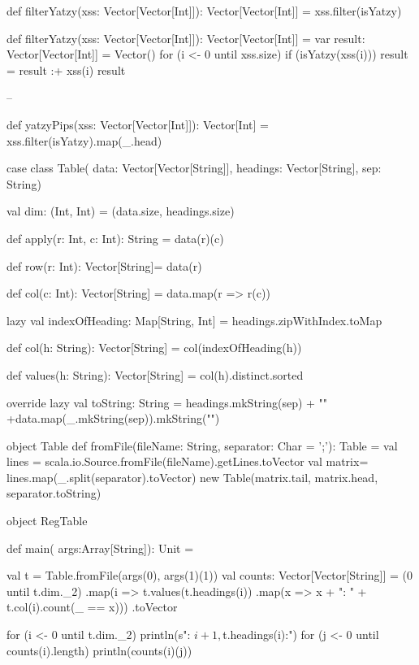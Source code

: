 \Subtask \begin{Code}
def filterYatzy(xss: Vector[Vector[Int]]): Vector[Vector[Int]] =
  xss.filter(isYatzy)
\end{Code}

\Subtask \begin{CodeSmall}
def filterYatzy(xss: Vector[Vector[Int]]): Vector[Vector[Int]] = {
	var result: Vector[Vector[Int]] = Vector()
	for (i <- 0 until xss.size) {
		if (isYatzy(xss(i))) result = result :+ xss(i)
	}
	result
}
\end{CodeSmall}

\Subtask --

\Subtask \begin{Code}
def yatzyPips(xss: Vector[Vector[Int]]): Vector[Int] =
  xss.filter(isYatzy).map(_.head)
\end{Code}


\Task     %

\Subtask \begin{CodeSmall}
case class Table(
	data: Vector[Vector[String]],
	headings: Vector[String],
	sep: String){

	val dim: (Int, Int) = (data.size, headings.size)

	def apply(r: Int, c: Int): String = data(r)(c)

	def row(r: Int): Vector[String]= data(r)

	def col(c: Int): Vector[String] = data.map(r => r(c))

	lazy val indexOfHeading: Map[String, Int] = headings.zipWithIndex.toMap

	def col(h: String): Vector[String] = col(indexOfHeading(h))

	def values(h: String): Vector[String] = col(h).distinct.sorted

	override lazy val toString: String =
		headings.mkString(sep) + "\n" +data.map(_.mkString(sep)).mkString("\n")
}
object Table {
	def fromFile(fileName: String, separator: Char = ';'): Table = {
		val lines = scala.io.Source.fromFile(fileName).getLines.toVector
		val matrix= lines.map(_.split(separator).toVector)
		new Table(matrix.tail, matrix.head, separator.toString)
	}
}
\end{CodeSmall}

\Subtask \begin{CodeSmall}
object RegTable {
 	def main( args:Array[String]): Unit = {
		val t = Table.fromFile(args(0), args(1)(1))
		val counts: Vector[Vector[String]] =
 			(0 until t.dim._2)
				.map(i => t.values(t.headings(i))
				.map(x => x + ": " + t.col(i).count(_ == x)))
				.toVector

    for (i <- 0 until t.dim._2) {
      println(s"\nColumn: ${i + 1}, ${t.headings(i)}:")
      for (j <- 0 until counts(i).length) {
        println(counts(i)(j))
      }
    }
  }
}
\end{CodeSmall}


